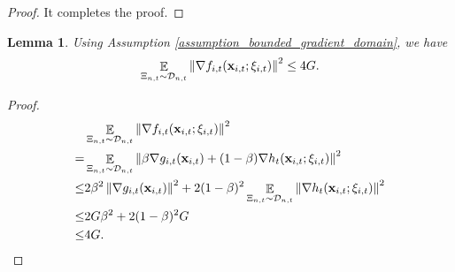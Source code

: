 \documentclass{article}
\newtheorem{Lemma}{\bf{Lemma}}
\begin{document}
\begin{proof}
It completes the proof.



\end{proof}


\begin{Lemma}
\label{lemma_stochastic_gradient_norm_bound}
Using Assumption \ref{assumption_bounded_gradient_domain}, we have
\begin{align}
\nonumber
\mathop{\mathbb{E}}_{ \Xi_{n,t} \sim \mathcal{D}_{n,t} }\left\lVert \nabla f_{i,t}({\bf x}_{i,t};\xi_{i,t})\right\rVert^2 \le 4G.
\end{align}


\end{Lemma}
\begin{proof}

\begin{align}
\nonumber
& \mathop{\mathbb{E}}_{ \Xi_{n,t} \sim \mathcal{D}_{n,t} }\left\lVert \nabla f_{i,t}({\bf x}_{i,t};\xi_{i,t})\right\rVert^2 \\ \nonumber 
= & \mathop{\mathbb{E}}_{ \Xi_{n,t} \sim \mathcal{D}_{n,t} }\left\lVert \beta \nabla g_{i,t}({\bf x}_{i,t}) + (1-\beta)\nabla h_t({\bf x}_{i,t};\xi_{i,t})\right\rVert^2 \\ \nonumber 
\le &  2\beta^2 \left\lVert \nabla g_{i,t}({\bf x}_{i,t}) \right\rVert^2 + 2(1-\beta)^2 \mathop{\mathbb{E}}_{ \Xi_{n,t} \sim \mathcal{D}_{n,t} } \left\lVert \nabla h_t({\bf x}_{i,t};\xi_{i,t}) \right\rVert^2 \\ \nonumber 
\le & 2G\beta^2  + 2(1-\beta)^2 G \\ \nonumber
\le & 4G.
\end{align} 
\end{proof}
\end{document}
